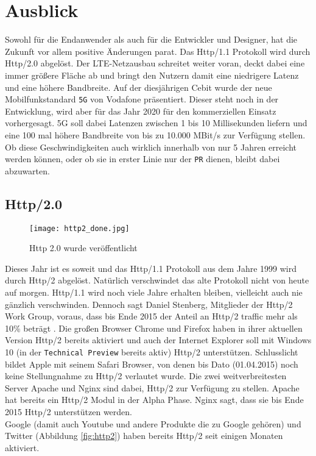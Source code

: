 \section{Ausblick} %
\label{sec:ausblick}
	Sowohl für die Endanwender als auch für die Entwickler und Designer, hat die Zukunft vor allem positive Änderungen parat. Das Http/1.1 Protokoll wird durch Http/2.0 abgelöst. Der LTE-Netzausbau schreitet weiter voran, deckt dabei eine immer größere Fläche ab und bringt den Nutzern damit eine niedrigere Latenz und eine höhere Bandbreite. Auf der diesjährigen Cebit wurde der neue Mobilfunkstandard \texttt{5G} von Vodafone präsentiert. Dieser steht noch in der Entwicklung, wird aber für das Jahr 2020 für den kommerziellen Einsatz vorhergesagt. 5G soll dabei Latenzen zwischen 1 bis 10 Millisekunden liefern und eine 100 mal höhere Bandbreite von bis zu 10.000 MBit/s zur Verfügung stellen.\autocite{lte-anbieter15} Ob diese Geschwindigkeiten auch wirklich innerhalb von nur 5 Jahren erreicht werden können, oder ob sie in erster Linie nur der \texttt{PR} dienen, bleibt dabei abzuwarten.

	\subsection{Http/2.0} %
	\label{sub:http_2_0}
		\begin{figure}[htbp]
			\begin{center}
				\texttt{[image: http2\_done.jpg]}
				\caption{Http 2.0 wurde veröffentlicht}
				\label{fig:http2_done}
			\end{center}
		\end{figure}

		Dieses Jahr ist es soweit und das Http/1.1 Protokoll aus dem Jahre 1999 wird durch Http/2 abgelöst. Natürlich verschwindet das alte Protokoll nicht von heute auf morgen. Http/1.1 wird noch viele Jahre erhalten bleiben, vielleicht auch nie gänzlich verschwinden. Dennoch sagt Daniel Stenberg, Mitglieder der Http/2 Work Group, voraus, dass bis Ende 2015 der Anteil an Http/2 traffic mehr als 10\% beträgt \autocite{stenberg15}. Die großen Browser Chrome und Firefox haben in ihrer aktuellen Version Http/2 bereits aktiviert und auch der Internet Explorer soll mit Windows 10 (in der \texttt{Technical Preview} bereits aktiv) Http/2 unterstützen.\autocite{microsoft14} Schlusslicht bildet Apple mit seinem Safari Browser, von denen bis Dato (01.04.2015) noch keine Stellungnahme zu Http/2 verlautet wurde.
		Die zwei weitverbreitesten Server Apache und Nginx sind dabei, Http/2 zur Verfügung zu stellen. Apache hat bereits ein Http/2 Modul in der Alpha Phase. Nginx sagt, dass sie bis Ende 2015 Http/2 unterstützen werden.\\
		Google (damit auch Youtube und andere Produkte die zu Google gehören) und Twitter (Abbildung \ref{fig:http2}) haben bereits Http/2 seit einigen Monaten aktiviert.

